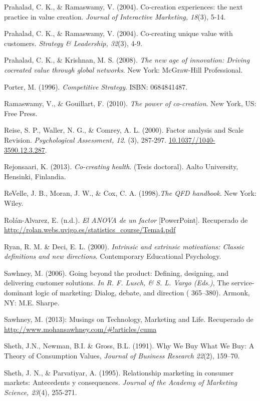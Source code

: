 \begin{thebibliography}{11}
	\bibitem{}
		Prahalad, C. K., \& Ramaswamy, V. (2004). Co-creation experiences: the next practice in value creation. \emph{Journal of Interactive Marketing, 18}(3), 5-14.

	\bibitem{}
		Prahalad, C. K., \& Ramaswamy, V. (2004). Co-creating unique value with customers. \emph{Strategy \& Leadership, 32}(3), 4-9.

	\bibitem{}
		Prahalad, C. K., \& Krishnan, M. S. (2008).  \emph{The new age of innovation: Driving cocreated value through global networks}. New York: McGraw-Hill Professional. 

	\bibitem{}
		Porter, M. (1996). \emph{Competitive Strategy}. ISBN: 0684841487.

	\bibitem{}
		Ramaswamy, V., \& Gouillart, F. (2010). \emph{The power of co-creation}. New York, US: Free Press.


	\bibitem{}
		Reise, S. P., Waller, N. G., \& Comrey, A. L. (2000). Factor analysis and Scale Revision. \emph{Psychological Assessment, 12}. (3), 287-297. \url{10.1037//1040-3590.12.3.287}.

	\bibitem{}
		 Rejonsaari, K. (2013). \emph{Co-creating health}. (Tesis doctoral). Aalto University, Hensinki, Finlandia.

	\bibitem{}
		ReVelle, J. B., Moran, J. W., \& Cox, C. A. (1998).\emph{The QFD handbook}. New York: Wiley.

	\bibitem{}
		Rolán-Alvarez, E. (n.d.). \emph{El ANOVA de un factor} [PowerPoint]. Recuperado de \url{http://rolan.webs.uvigo.es/statistics_course/Tema4.pdf}

	\bibitem{}
		Ryan, R. M. \& Deci, E. L. (2000). \emph{Intrinsic and extrinsic motivations: Classic definitions and new directions}. Contemporary Educational Psychology.

	\bibitem{}
		Sawhney, M. (2006). Going beyond the product: Defining, designing, and delivering customer solutions. \emph{In R. F. Lusch, \& S. L. Vargo (Eds.)}, The service-dominant logic of marketing: Dialog, debate, and direction ( 365–380). Armonk, NY: M.E. Sharpe.

	\bibitem{}
		Sawhney, M. (2013): Musings on Technology, Marketing and Life.  Recuperado de \url{http://www.mohansawhney.com/#!articles/cuma}

	\bibitem{}
		Sheth, J.N., Newman, B.I. \& Gross, B.L. (1991). Why We Buy What We Buy: A Theory of Consumption Values, \emph{Journal of Business Research 22}(2), 159–70.

	\bibitem{}
		Sheth, J. N., \& Parvatiyar, A. (1995). Relationship marketing in consumer markets: Antecedents y consequences.  \emph{Journal of the Academy of Marketing Science, 23}(4), 255-271.


\end{thebibliography}
